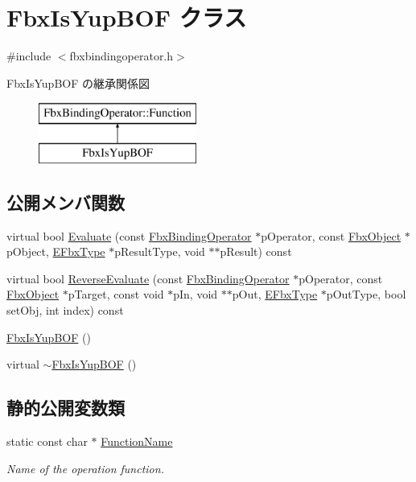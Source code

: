 \hypertarget{class_fbx_is_yup_b_o_f}{}\section{Fbx\+Is\+Yup\+B\+OF クラス}
\label{class_fbx_is_yup_b_o_f}


{\ttfamily \#include $<$fbxbindingoperator.\+h$>$}

Fbx\+Is\+Yup\+B\+OF の継承関係図\begin{figure}[H]
\begin{center}
\leavevmode
\includegraphics[height=2.000000cm]{class_fbx_is_yup_b_o_f}
\end{center}
\end{figure}
\subsection*{公開メンバ関数}
\begin{DoxyCompactItemize}
\item 
virtual bool \hyperlink{class_fbx_is_yup_b_o_f_a9833ec572b4af6536e46e185f1fad6b9}{Evaluate} (const \hyperlink{class_fbx_binding_operator}{Fbx\+Binding\+Operator} $\ast$p\+Operator, const \hyperlink{class_fbx_object}{Fbx\+Object} $\ast$p\+Object, \hyperlink{fbxpropertytypes_8h_a73913a5ddfb20e57c6f25e9e6784bd92}{E\+Fbx\+Type} $\ast$p\+Result\+Type, void $\ast$$\ast$p\+Result) const
\item 
virtual bool \hyperlink{class_fbx_is_yup_b_o_f_a27c960322c0b7c6a4aec67484fcfcf52}{Reverse\+Evaluate} (const \hyperlink{class_fbx_binding_operator}{Fbx\+Binding\+Operator} $\ast$p\+Operator, const \hyperlink{class_fbx_object}{Fbx\+Object} $\ast$p\+Target, const void $\ast$p\+In, void $\ast$$\ast$p\+Out, \hyperlink{fbxpropertytypes_8h_a73913a5ddfb20e57c6f25e9e6784bd92}{E\+Fbx\+Type} $\ast$p\+Out\+Type, bool set\+Obj, int index) const
\item 
\hyperlink{class_fbx_is_yup_b_o_f_a92123eda1c5d19cc7b55699cd381f06f}{Fbx\+Is\+Yup\+B\+OF} ()
\item 
virtual \hyperlink{class_fbx_is_yup_b_o_f_a4359148e3255a58f4a806fb10de9a259}{$\sim$\+Fbx\+Is\+Yup\+B\+OF} ()
\end{DoxyCompactItemize}
\subsection*{静的公開変数類}
\begin{DoxyCompactItemize}
\item 
static const char $\ast$ \hyperlink{class_fbx_is_yup_b_o_f_a0db8ffbc3f9941561f19ad457493f917}{Function\+Name}
\begin{DoxyCompactList}\small\item\em Name of the operation function. \end{DoxyCompactList}\end{DoxyCompactItemize}


